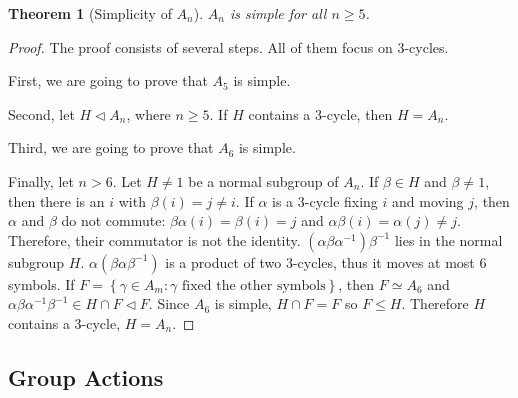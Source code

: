 \documentclass{article}
\newtheorem{Thm}{Theorem}[section]
\theoremstyle{definition}
\begin{document}
\begin{Thm}[Simplicity of $A_n$]
$A_n$ is simple for all $n\ge 5$.
\end{Thm}
\begin{proof}
The proof consists of several steps. All of them focus on $3$-cycles.\par 
First, we are going to prove that $A_5$ is simple. 

Second, let $H\lhd A_n$, where $n\ge 5$. If $H$ contains a $3$-cycle, then $H=A_n$.

Third, we are going to prove that $A_6$ is simple.

Finally, let $n>6$. Let $H\ne 1$ be a normal subgroup of $A_n$. If $\beta\in H$ and $\beta\ne 1$, then there is an $i$ with $\beta(i)=j\ne i$. If $\alpha$ is a $3$-cycle fixing $i$ and moving $j$,
then $\alpha$ and $\beta$ do not commute: $\beta\alpha(i)=\beta(i)=j$ and $\alpha\beta(i)=\alpha(j)\ne j$. Therefore, their commutator is not the identity.
$(\alpha\beta\alpha^{-1})\beta^{-1}$ lies in the normal subgroup $H$. $\alpha(\beta\alpha\beta^{-1})$ is a product of two $3$-cycles, thus it moves at most $6$ symbols.
If $F=\left\{\gamma\in A_m: \gamma\text{ fixed the other symbols}\right\}$, then $F\simeq A_6$ and $\alpha\beta\alpha^{-1}\beta^{-1}\in H\cap F\lhd F$. Since $A_6$ is simple, $H\cap F=F$ so $F\le H$.
Therefore $H$ contains a $3$-cycle, $H=A_n$.
\end{proof}



\subsection{Group Actions}
\end{document}
